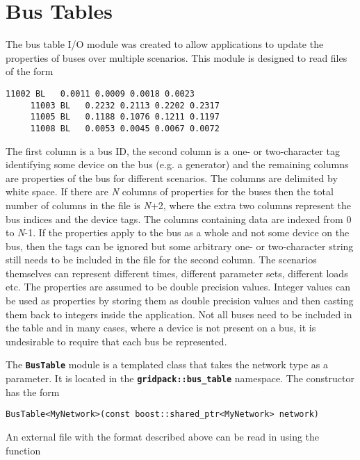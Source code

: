 \section{Bus Tables}

The bus table I/O module was created to allow applications to update the properties of buses over multiple scenarios. This module is designed to read files of the form

{
\color{red}
\bfseries
\begin{Verbatim}[commandchars=\\\{\}]
     11002 BL   0.0011 0.0009 0.0018 0.0023
     11003 BL   0.2232 0.2113 0.2202 0.2317
     11005 BL   0.1188 0.1076 0.1211 0.1197
     11008 BL   0.0053 0.0045 0.0067 0.0072
\end{Verbatim}
}

The first column is a bus ID, the second column is a one- or two-character tag identifying some device on the bus (e.g. a generator) and the remaining columns are properties of the bus for different scenarios. The columns are delimited by white space. If there are \textit{N} columns of properties for the buses then the total number of columns in the file is \textit{N}+2, where the extra two columns represent the bus indices and the device tags. The columns containing data are indexed from 0 to \textit{N}-1. If the properties apply to the bus as a whole and not some device on the bus, then the tags can be ignored but some arbitrary one- or two-character string still needs to be included in the file for the second column. The scenarios themselves can represent different times, different parameter sets, different loads etc. The properties are assumed to be double precision values. Integer values can be used as properties by storing them as double precision values and then casting them back to integers inside the application. Not all buses need to be included in the table and in many cases, where a device is not present on a bus, it is undesirable to require that each bus be represented.

The \texttt{\textbf{BusTable}} module is a templated class that takes the network type as a parameter.  It is located in the \texttt{\textbf{gridpack::bus\_table}} namespace. The constructor has the form

{
\color{red}
\begin{Verbatim}[fontseries=b]
BusTable<MyNetwork>(const boost::shared_ptr<MyNetwork> network)
\end{Verbatim}
}

An external file with the format described above can be read in using the function

